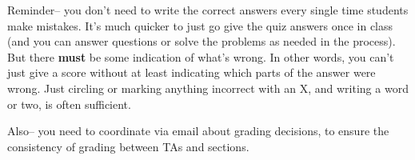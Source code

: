 \documentclass[11pt,fleqn]{article}
\begin{document}

  Reminder-- you don't need to write the correct answers every single time
students make mistakes.  It's much quicker to just go give the quiz answers
once in class (and you can answer questions or solve the problems as needed
in the process).  But there \textbf{must} be some indication of what's
wrong.  In other words, you can't just give a score without at least
indicating which parts of the answer were wrong.  Just circling or marking
anything incorrect with an X, and writing a word or two, is often
sufficient.

  Also-- you need to coordinate via email about grading decisions, to ensure
the consistency of grading between TAs and sections.

  \vspace{-.5mm}
\end{document}
